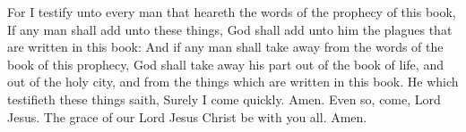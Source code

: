  For I testify unto every man that heareth the words of the
prophecy of this book, If any man shall add unto these things, God shall
add unto him the plagues that are written in this book: 
And if any man shall take away from the words of the book of this
prophecy, God shall take away his part out of the book of life, and out
of the holy city, and from the things which are written in this book.
 He which testifieth these things saith, Surely I come
quickly. Amen. Even so, come, Lord Jesus.  The grace of our
Lord Jesus Christ be with you all. Amen.
